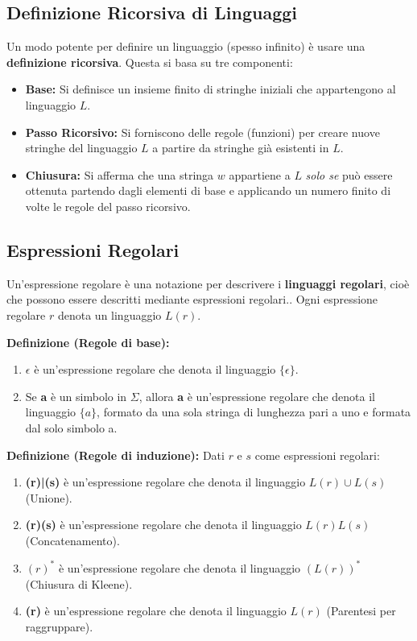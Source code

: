 \subsection{Definizione Ricorsiva di Linguaggi}
Un modo potente per definire un linguaggio (spesso infinito) è usare una \textbf{definizione ricorsiva}. Questa si basa su tre componenti:
\begin{itemize}
    \item \textbf{Base:} Si definisce un insieme finito di stringhe iniziali che appartengono al linguaggio $L$.
    \item \textbf{Passo Ricorsivo:} Si forniscono delle regole (funzioni) per creare nuove stringhe del linguaggio $L$ a partire da stringhe già esistenti in $L$.
    \item \textbf{Chiusura:} Si afferma che una stringa $w$ appartiene a $L$ \textit{solo se} può essere ottenuta partendo dagli elementi di base e applicando un numero finito di volte le regole del passo ricorsivo.
\end{itemize}


\subsection{Espressioni Regolari}
Un'espressione regolare è una notazione per descrivere i \textbf{linguaggi regolari}, cioè che possono essere descritti mediante espressioni regolari.. Ogni espressione regolare $r$ denota un linguaggio $L(r)$.

\vspace{0.2 cm}

\textbf{Definizione (Regole di base):}
\begin{enumerate}
    \item \textbf{$\epsilon$} è un'espressione regolare che denota il linguaggio $\{\epsilon\}$.
    \item Se \textbf{a} è un simbolo in $\Sigma$, allora \textbf{a} è un'espressione regolare che denota il linguaggio $\{a\}$, formato da una sola stringa di lunghezza pari a uno e formata dal solo simbolo a.
\end{enumerate}

\textbf{Definizione (Regole di induzione):} Dati $r$ e $s$ come espressioni regolari:
\begin{enumerate}
    \item \textbf{(r)|(s)} è un'espressione regolare che denota il linguaggio $L(r) \cup L(s)$ (Unione).
    \item \textbf{(r)(s)} è un'espressione regolare che denota il linguaggio $L(r)L(s)$ (Concatenamento).
    \item \textbf{$(r)^*$} è un'espressione regolare che denota il linguaggio $(L(r))^*$ (Chiusura di Kleene).
    \item \textbf{(r)} è un'espressione regolare che denota il linguaggio $L(r)$ (Parentesi per raggruppare).
\end{enumerate}

